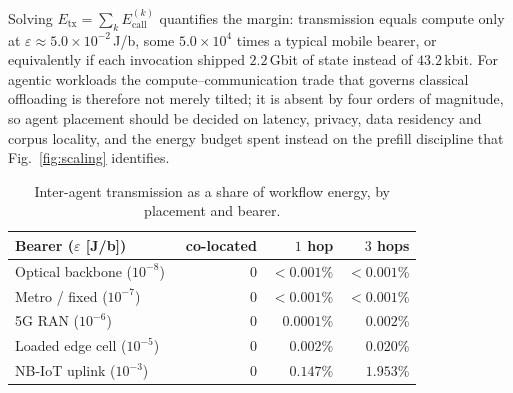 \documentclass[journal]{IEEEtran}
\newif\ifshowchanges \showchangestrue
\newcommand{\NEW}{\ifshowchanges\color{blue}\fi}
\newcommand{\OLD}{\ifshowchanges\color{black}\fi}
\newcommand{\handoffBits}{$43.2$\,kbit}                 %
\newcommand{\parityJpb}{\ensuremath{5.0\times10^{-2}}}  %
\newcommand{\parityFactor}{\ensuremath{5.0\times10^{4}}}%
\newcommand{\parityVolume}{$2.2$\,Gbit}                 %
\begin{document}
Solving $E_{\mathrm{tx}}=\sum_k E_{\mathrm{call}}^{(k)}$ quantifies the margin:
transmission equals compute only at $\varepsilon\approx\parityJpb$\,J/b, some \parityFactor{} times a
typical mobile bearer, or equivalently if each invocation shipped \parityVolume{} of state instead
of \handoffBits{}. For agentic workloads the compute--communication trade that governs classical
offloading is therefore not merely tilted; it is absent by four orders of magnitude, so agent
placement should be decided on latency, privacy, data residency and corpus locality, and the
energy
budget spent instead on the prefill discipline that Fig.~\ref{fig:scaling} identifies.

\begin{table}[t]
\caption{Inter-agent transmission as a share of workflow energy, by placement and bearer.}
\label{tab:placement}
\centering
\small
\begin{tabular}{@{}lrrr@{}}
\toprule
Bearer ($\varepsilon$ [J/b]) & co-located & $1$ hop & $3$ hops \\
\midrule
Optical backbone ($10^{-8}$)~\NEW{}\cite{vanheddeghem2012}\OLD{}   & $0$ & $<0.001$\% & $<0.001$\% \\
Metro / fixed ($10^{-7}$)~\NEW{}\cite{lorincz2025ftth}\OLD{}       & $0$ & $<0.001$\% & $<0.001$\% \\
5G RAN ($10^{-6}$)~\NEW{}\cite{xu2020operational}\OLD{}            & $0$ & $0.0001$\% & $0.002$\% \\
Loaded edge cell ($10^{-5}$)~\NEW{}\cite{xu2020operational}\OLD{}  & $0$ & $0.002$\%  & $0.020$\% \\
NB-IoT uplink ($10^{-3}$)~\NEW{}\cite{michelinakis2020nbiot}\OLD{} & $0$ & $0.147$\%  & $1.953$\% \\
\bottomrule

\end{tabular}
\end{table}
\end{document}
